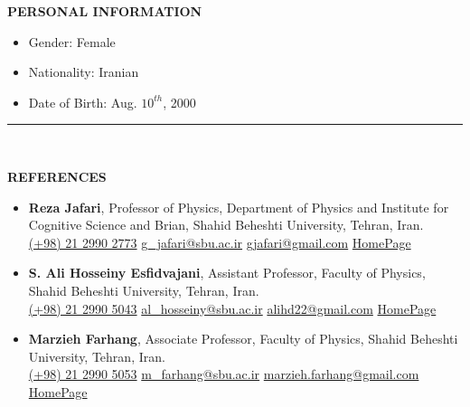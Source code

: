 \documentclass[11pt, b4paper]{cv}
\begin{document}
\textbf{PERSONAL INFORMATION}
\vspace{-0.1in}

\begin{multicols}{3}[\columnsep=0cm]
	\begin{itemize}
	  \item Gender: Female
	  \item Nationality: Iranian
	  \item Date of Birth: Aug. $10^{th}$, 2000
	\end{itemize}
\end{multicols}

\vspace{-0.15in}
\rule{\textwidth}{1pt}\\
\vspace{-0.15in}

\textbf{REFERENCES}
\vspace{-0.1in}

\begin{itemize}
	\item \textbf{Reza Jafari}, Professor of Physics, Department of Physics and Institute for Cognitive Science and Brian, Shahid Beheshti University, Tehran, Iran.\\
	
	
	\href{tel:(+98)2129902773}{ (+98) 21 2990 2773}
	\hspace{0.5in}
	\href{mailto:g\_jafari@sbu.ac.ir}{ g\_jafari@sbu.ac.ir}
	\hspace{0.75in}
	\href{mailto:gjafari@gmail.com}{ gjafari@gmail.com}
	\hspace{1.14in}
	\href{https://complexity.sbu.ac.ir/professor-reza-jafari/}{HomePage} 
	\item \textbf{S. Ali Hosseiny Esfidvajani}, Assistant Professor, Faculty of Physics, Shahid Beheshti University, Tehran, Iran.\\
	
	\href{tel:(+98)2129905043}{ (+98) 21 2990 5043}
	\hspace{0.5in}
	\href{mailto:al\_hosseiny@sbu.ac.ir}{ al\_hosseiny@sbu.ac.ir}
	\hspace{0.5in}
	\href{mailto:alihd22@gmail.com}{ alihd22@gmail.com}
	\hspace{1.091in}
	\href{https://alihosseiny.com/}{HomePage} 
		
	\item \textbf{Marzieh Farhang}, Associate Professor, Faculty of Physics, Shahid Beheshti University, Tehran, Iran.\\
	
	\href{tel:(+98)2129905053}{ (+98) 21 2990 5053}
	\hspace{0.5in}
	\href{mailto:m\_farhang@sbu.ac.ir}{ m\_farhang@sbu.ac.ir}
	\hspace{0.54in}
	\href{mailto:marzieh.farhang@gmail.com}{ marzieh.farhang@gmail.com}
	\hspace{0.5in}
	\href{https://en.sbu.ac.ir/~m_farhang/home}{HomePage} 
\end{itemize}
\end{document}
